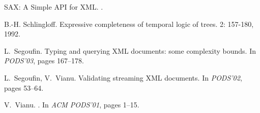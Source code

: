 \documentclass{LMCS}
\theoremstyle{plain}
\theoremstyle{definition}
\begin{document}
\begin{thebibliography}{99}
SAX: A Simple API for XML.
. 

B.-H. Schlingloff. 
\newblock Expressive completeness of temporal logic of trees. 
 2: 157-180, 1992.

L.~Segoufin.
\newblock  Typing and querying XML documents: some complexity bounds. 
\newblock In {\em PODS'03}, pages 167--178. 

L.~Segoufin, V.~Vianu.
\newblock Validating streaming XML documents. 
\newblock In {\em PODS'02},
pages 53--64. 

V.~Vianu.
.
\newblock In {\em ACM PODS'01}, 
pages 1--15.
\end{thebibliography}

\appendix
\end{document}
